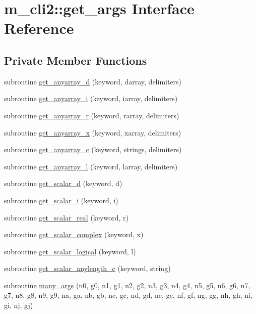\hypertarget{interfacem__cli2_1_1get__args}{}\section{m\+\_\+cli2\+:\+:get\+\_\+args Interface Reference}
\label{interfacem__cli2_1_1get__args}
\subsection*{Private Member Functions}
\begin{DoxyCompactItemize}
\item 
subroutine \mbox{\hyperlink{interfacem__cli2_1_1get__args_ac1595f7435cd331533eade965bb371dc}{get\+\_\+anyarray\+\_\+d}} (keyword, darray, delimiters)
\item 
subroutine \mbox{\hyperlink{interfacem__cli2_1_1get__args_a958091825d17ff491815f01f634933fa}{get\+\_\+anyarray\+\_\+i}} (keyword, iarray, delimiters)
\item 
subroutine \mbox{\hyperlink{interfacem__cli2_1_1get__args_a1cf569a2a24fec1774e7c73c40598661}{get\+\_\+anyarray\+\_\+r}} (keyword, rarray, delimiters)
\item 
subroutine \mbox{\hyperlink{interfacem__cli2_1_1get__args_a8581641c551aa6fe4c0592fb63de11fe}{get\+\_\+anyarray\+\_\+x}} (keyword, xarray, delimiters)
\item 
subroutine \mbox{\hyperlink{interfacem__cli2_1_1get__args_aa60d116ceb254630c102ef174471e375}{get\+\_\+anyarray\+\_\+c}} (keyword, strings, delimiters)
\item 
subroutine \mbox{\hyperlink{interfacem__cli2_1_1get__args_a3ff3d0bd398e40fd207c2aa09b5bf8a9}{get\+\_\+anyarray\+\_\+l}} (keyword, larray, delimiters)
\item 
subroutine \mbox{\hyperlink{interfacem__cli2_1_1get__args_a118d13d610c68afb422c2dbefa07c6f8}{get\+\_\+scalar\+\_\+d}} (keyword, d)
\item 
subroutine \mbox{\hyperlink{interfacem__cli2_1_1get__args_a40f19581d7e5bcf7450391e2ac2b26a3}{get\+\_\+scalar\+\_\+i}} (keyword, i)
\item 
subroutine \mbox{\hyperlink{interfacem__cli2_1_1get__args_aa6f39c9132687c0396d3b054bc5e47f6}{get\+\_\+scalar\+\_\+real}} (keyword, r)
\item 
subroutine \mbox{\hyperlink{interfacem__cli2_1_1get__args_a6c9a2315891b94aa062c34c82082a9da}{get\+\_\+scalar\+\_\+complex}} (keyword, x)
\item 
subroutine \mbox{\hyperlink{interfacem__cli2_1_1get__args_a067f9a7dd7edb825afb728f069b3233e}{get\+\_\+scalar\+\_\+logical}} (keyword, l)
\item 
subroutine \mbox{\hyperlink{interfacem__cli2_1_1get__args_a42c3b7050881edf76682b7b0058b868a}{get\+\_\+scalar\+\_\+anylength\+\_\+c}} (keyword, string)
\item 
subroutine \mbox{\hyperlink{interfacem__cli2_1_1get__args_a32499d7956d071a430aca046c20e03c3}{many\+\_\+args}} (n0, g0, n1, g1, n2, g2, n3, g3, n4, g4, n5, g5, n6, g6, n7, g7, n8, g8, n9, g9, na, ga, nb, gb, nc, gc, nd, gd, ne, ge, nf, gf, ng, gg, nh, gh, ni, gi, nj, gj)
\end{DoxyCompactItemize}



